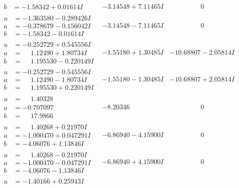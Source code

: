 \documentclass[1p]{elsarticle_modified}
\theoremstyle{definition}
\begin{document}
$$\begin{array}{c|c|c}
\begin{aligned}
b &= -1.58342 + 0.01614 I\end{aligned}
 & -3.14548 + 7.11465 I & \phantom{-0.000000 } 0 \\ \hline\begin{aligned}
u &= -1.363580 - 0.289426 I \\
a &= -0.378679 - 0.156042 I \\
b &= -1.58342 - 0.01614 I\end{aligned}
 & -3.14548 - 7.11465 I & \phantom{-0.000000 } 0 \\ \hline\begin{aligned}
u &= -0.252729 + 0.545556 I \\
a &= \phantom{-}1.12490 + 1.80734 I \\
b &= \phantom{-}1.195530 - 0.220149 I\end{aligned}
 & -1.55180 + 1.30485 I & -10.68807 - 2.05814 I \\ \hline\begin{aligned}
u &= -0.252729 - 0.545556 I \\
a &= \phantom{-}1.12490 - 1.80734 I \\
b &= \phantom{-}1.195530 + 0.220149 I\end{aligned}
 & -1.55180 - 1.30485 I & -10.68807 + 2.05814 I \\ \hline\begin{aligned}
u &= \phantom{-}1.40328\phantom{ +0.000000I} \\
a &= -0.707097\phantom{ +0.000000I} \\
b &= \phantom{-}17.9866\phantom{ +0.000000I}\end{aligned}
 & -8.20346\phantom{ +0.000000I} & \phantom{-0.000000 } 0 \\ \hline\begin{aligned}
u &= \phantom{-}1.40268 + 0.21970 I \\
a &= -1.000470 + 0.047291 I \\
b &= -4.06076 + 1.13846 I\end{aligned}
 & -6.86940 - 4.15900 I & \phantom{-0.000000 } 0 \\ \hline\begin{aligned}
u &= \phantom{-}1.40268 - 0.21970 I \\
a &= -1.000470 - 0.047291 I \\
b &= -4.06076 - 1.13846 I\end{aligned}
 & -6.86940 + 4.15900 I & \phantom{-0.000000 } 0 \\ \hline\begin{aligned}
u &= -1.40166 + 0.25943 I \\

\end{aligned}
\end{array}$$
\end{document}
